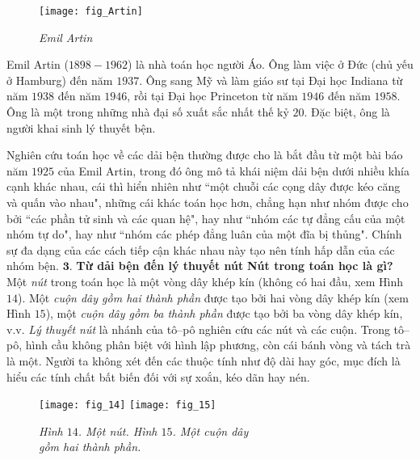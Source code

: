 \begin{multicols}{2}
\begin{tBox}
\begin{figure}
			\texttt{[image: fig\_Artin]}
			\caption{\small\textit{\color{duongvaotoanhoc}Emil Artin}}
			\vspace*{-15pt}
		\end{figure}
		Emil Artin ($1898-1962$) là nhà toán học người Áo. Ông làm việc ở Đức (chủ yếu ở Hamburg) đến năm $1937$. Ông sang Mỹ và làm giáo sư tại Đại học Indiana từ năm $1938$ đến năm $1946$, rồi tại Đại học Princeton từ năm $1946$ đến năm $1958$. Ông là một trong những nhà đại số xuất sắc nhất thế kỷ $20$. Đặc biệt, ông là người khai sinh lý thuyết bện.
	\end{tBox}
	Nghiên cứu toán học về các dải bện thường được cho là bắt đầu từ một bài báo năm $1925$ của Emil Artin, trong đó ông mô tả khái niệm dải bện dưới nhiều khía cạnh khác nhau, cái thì hiển nhiên như ``một chuỗi các cọng dây được kéo căng và quấn vào nhau", những cái khác toán học hơn, chẳng hạn như nhóm được cho bởi ``các phần tử sinh và các quan hệ", hay như ``nhóm các tự đẳng cấu của một nhóm tự do", hay như  ``nhóm các phép đẳng luân của một đĩa bị thủng". Chính sự đa dạng của các cách tiếp cận khác nhau này tạo nên tính hấp dẫn của các nhóm bện.
	\vskip 0.1cm
	$\pmb{3.}$ \textbf{\color{duongvaotoanhoc}Từ dải bện đến lý thuyết nút}
	\vskip 0.1cm
	\textbf{\color{duongvaotoanhoc}Nút trong toán học là gì?}
	\vskip 0.1cm
	Một \textit{nút} trong toán học là một vòng dây khép kín (không có hai đầu, xem Hình $14$). Một \textit{cuộn dây gồm hai thành phần} được tạo bởi hai vòng dây khép kín (xem Hình $15$), một \textit{cuộn dây gồm ba thành phần} được tạo bởi ba vòng dây khép kín, v.v. \textit{Lý thuyết nút} là nhánh của tô--pô nghiên cứu các nút và các cuộn. Trong tô--pô, hình cầu không phân biệt với hình lập phương, còn cái bánh vòng và tách trà là một. Người ta không xét đến các thuộc tính như độ dài hay góc, mục đích là hiểu các tính chất bất biến đối với sự xoắn, kéo dãn hay nén.
	\begin{figure}[H]
		\vspace*{-10pt}
		\centering
		\captionsetup{labelformat= empty, justification=centering}
		\hspace*{5pt}\texttt{[image: fig\_14]}\hspace*{25pt}
		\texttt{[image: fig\_15]}
		\caption{\small\textit{\color{duongvaotoanhoc}\hspace*{10pt}Hình $14$. Một nút. \hspace*{10pt} Hình $15$. Một cuộn dây\\ \hspace*{96pt}gồm hai thành phần.}}
		\vspace*{-10pt}

\end{figure}
\end{multicols}
